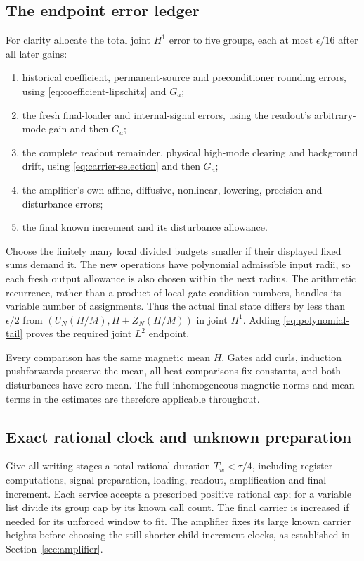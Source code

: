 \documentclass[11pt,a4paper]{amsart}
\theoremstyle{definition}
\theoremstyle{remark}
\numberwithin{equation}{section}
\begin{document}
\subsection{The endpoint error ledger}
For clarity allocate the total joint $H^1$ error to five groups, each at most
$\epsilon/16$ after all later gains:
\begin{enumerate}
\item historical coefficient, permanent-source and preconditioner rounding
errors, using \eqref{eq:coefficient-lipschitz} and $G_a$;
\item the fresh final-loader and internal-signal errors, using the readout's
arbitrary-mode gain and then $G_a$;
\item the complete readout remainder, physical high-mode clearing and
background drift, using \eqref{eq:carrier-selection} and then $G_a$;
\item the amplifier's own affine, diffusive, nonlinear, lowering, precision
and disturbance errors;
\item the final known increment and its disturbance allowance.
\end{enumerate}
Choose the finitely many local divided budgets smaller if their displayed
fixed sums demand it. The new operations have polynomial admissible input
radii, so each fresh output allowance is also chosen within the next radius.
The arithmetic recurrence, rather than a product of local gate condition
numbers, handles its variable number of assignments. Thus the actual final
state differs by less than $\epsilon/2$ from
$(U_N(H/M),H+Z_N(H/M))$ in joint $H^1$. Adding
\eqref{eq:polynomial-tail} proves the required joint $L^2$ endpoint.

Every comparison has the same magnetic mean $H$. Gates add curls, induction
pushforwards preserve the mean, all heat comparisons fix constants, and both
disturbances have zero mean. The full inhomogeneous magnetic norms and mean
terms in the estimates are therefore applicable throughout.

\subsection{Exact rational clock and unknown preparation}
Give all writing stages a total rational duration $T_w<\tau/4$, including
register computations, signal preparation, loading, readout, amplification
and final increment. Each service accepts a prescribed positive rational cap;
for a variable list divide its group cap by its known call count. The final
carrier is increased if needed for its unforced window to fit. The amplifier
fixes its large known carrier heights before choosing the still shorter
child increment clocks, as established in Section~\ref{sec:amplifier}.
\end{document}
